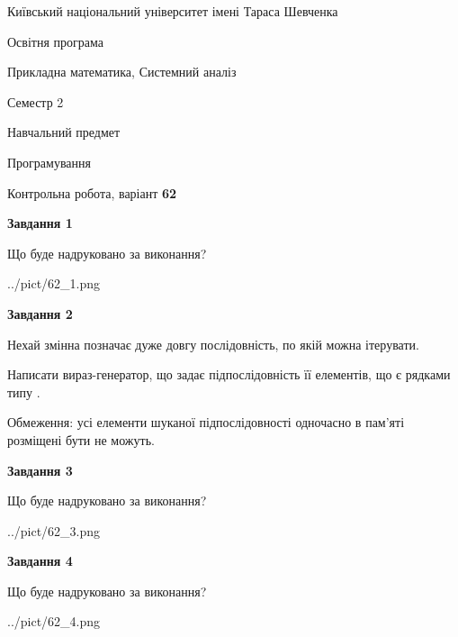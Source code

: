 \documentclass[12pt, ukrainian]{article}
\begin{document}
{{\begin {small}\par
{ \center  Київський національний університет імені Тараса Шевченка \par}
{\parbox {5 cm}{Освітня програма \hfill}{\parbox {8 cm}{Прикладна математика, Системний аналіз \hfill}}\parbox {5 cm}{\hfill Семестр 2}}\par
{\parbox {5 cm} {Навчальний предмет \hfill}\parbox {7 cm}{Програмування \hfill}\parbox {6cm}{\hfill}\par}\vspace{-7pt} \end{small}}{\center Контрольна робота, варіант  \No \textbf
{ 62 }\par}}
{
\begin {large}
{\begin {center}\textbf{Завдання 1}\end {center}}\par
Що буде надруковано за виконання?\par\par
\begin{center}
	{../pict/62_1.png}
\end{center}
\newpage

{\begin {center}\textbf{Завдання 2}\end {center}}\par
Нехай змінна  позначає дуже довгу послідовність, по якій можна ітерувати.

Написати вираз-генератор, що задає підпослідовність її елементів, що є рядками типу .

Обмеження: усі елементи шуканої підпослідовності одночасно в пам'яті розміщені бути не можуть.\par
\newpage

{\begin {center}\textbf{Завдання 3}\end {center}}\par
Що буде надруковано за виконання?
\begin{center}
	{../pict/62_3.png}
\end{center}
\newpage

{\begin {center}\textbf{Завдання 4}\end {center}}\par
Що буде надруковано за виконання?\par
\begin{center}
	{../pict/62_4.png}
\end{center}
\newpage


\end{large}}
\end{document}
